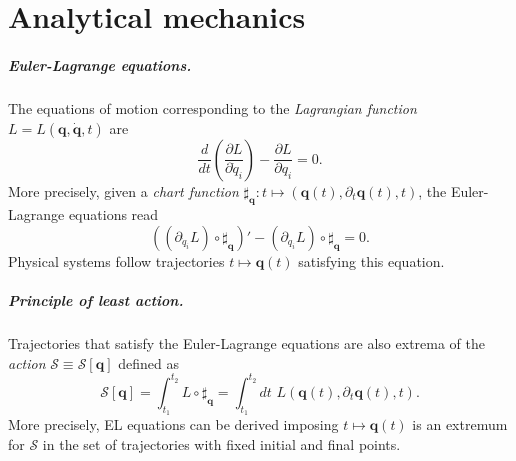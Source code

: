 \documentclass[12pt]{report}
\newcommand{\bs}[1]{\boldsymbol{#1}}
\newcommand{\calS}{{\mathcal{S}}}
\begin{document}
\chapter{Analytical mechanics}

\paragraph{Euler-Lagrange equations.}
The equations of motion corresponding to the \emph{Lagrangian function} $L=L(\bs q,\dot{\bs q},t)$ are
\begin{equation}
	\frac{d}{dt}\left(\frac{\partial L}{\partial \dot q_i}\right) -
	\frac{\partial L}{\partial q_i} = 0.
\end{equation}
More precisely, given a \emph{chart function} $\sharp_{\bs q}:t\mapsto (\bs q(t),\partial_t \bs q(t),t)$, the Euler-Lagrange equations read
\begin{equation}
	((\partial_{\dot q_i}L)\circ\sharp_{\bs q})' - (\partial_{q_i}L)\circ\sharp_{\bs q} = 0.
\end{equation}
Physical systems follow trajectories $t\mapsto\bs q(t)$ satisfying this equation.

\paragraph{Principle of least action.}
Trajectories that satisfy the Euler-Lagrange equations are also extrema of the \emph{action} $\calS\equiv \calS[\bs q]$ defined as
\begin{equation}
	\calS[\bs q]
	= \int_{t_1}^{t_2} L \circ \sharp_{\bs q}
	= \int_{t_1}^{t_2} dt \,\, L(\bs q(t),\partial_t \bs q(t),t).
\end{equation}
More precisely, EL equations can be derived imposing $t\mapsto\bs q(t)$ is an extremum for $\calS$ in the set of trajectories with fixed initial and final points.
\end{document}
